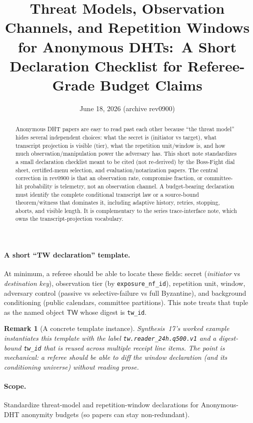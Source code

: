 \documentclass[11pt]{article}
\title{Threat Models, Observation Channels, and Repetition Windows for Anonymous DHTs:\ A Short Declaration Checklist for Referee-Grade Budget Claims}
\author{}
\date{June 18, 2026 (archive rev0900)}
\newtheorem{remark}{Remark}
\begin{document}
\maketitle

\begin{abstract}
Anonymous DHT papers are easy to read past each other because ``the threat model'' hides several independent choices:
what the secret is (initiator vs target), what transcript projection is visible (tier), what the repetition unit/window is, and how much observation/manipulation power the adversary has.
This short note standardizes a small declaration checklist meant to be cited (not re-derived) by the Boss-Fight dial sheet, certified-menu selection, and evaluation/notarization papers.
The central correction in rev0900 is that an observation rate, compromise fraction, or committee-hit probability is telemetry, not an observation channel. A budget-bearing declaration must identify the complete conditional transcript law or a source-bound theorem/witness that dominates it, including adaptive history, retries, stopping, aborts, and visible length.
It is complementary to the series trace-interface note, which owns the transcript-projection vocabulary.
\end{abstract}


\paragraph{A short ``TW declaration'' template.}
At minimum, a referee should be able to locate these fields: secret (\emph{initiator} vs \emph{destination key}), observation tier (by \texttt{exposure\_nf\_id}), repetition unit, window, adversary control (passive vs selective-failure vs full Byzantine), and background conditioning (public calendars, committee partitions).
This note treats that tuple as the named object \(\mathsf{TW}\) whose digest is \texttt{tw\_id}.


\begin{remark}[A concrete template instance]
Synthesis~17's worked example instantiates this template with the label
\texttt{tw.reader\_24h.q500.v1} and a digest-bound \texttt{tw\_id} that is reused across multiple receipt line items.
The point is mechanical: a referee should be able to diff the window declaration (and its conditioning universe) without reading prose.\cite{series:workedexample,series:receiptitems}
\end{remark}


\paragraph{Scope.}
Standardize threat-model and repetition-window declarations for Anonymous-DHT anonymity budgets (so papers can stay non-redundant).
\end{document}
